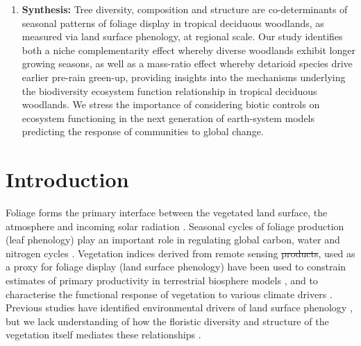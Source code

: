 \documentclass[11pt,a4paper]{article}
\providecommand{\DIFaddtex}[1]{{\protect\color{blue}\uwave{#1}}} %
\providecommand{\DIFdeltex}[1]{{\protect\color{red}\sout{#1}}}                      %
\providecommand{\DIFaddbegin}{} %
\providecommand{\DIFaddend}{} %
\providecommand{\DIFdelbegin}{} %
\providecommand{\DIFdelend}{} %
\providecommand{\DIFadd}[1]{\texorpdfstring{\DIFaddtex{#1}}{#1}} %
\providecommand{\DIFdel}[1]{\texorpdfstring{\DIFdeltex{#1}}{}} %
\newcommand{\DIFscaledelfig}{0.5}
\newlength{\DIFdelgraphicswidth} %
\newlength{\DIFdelgraphicsheight} %
\newcommand{\DIFaddincludegraphics}[2][]{{\color{blue}\fbox{\DIFOincludegraphics[#1]{#2}}}} %
\newcommand{\DIFdelincludegraphics}[2][]{%
\sbox{\DIFdelgraphicsbox}{\DIFOincludegraphics[#1]{#2}}%
\settoboxwidth{\DIFdelgraphicswidth}{\DIFdelgraphicsbox} %
\settoboxtotalheight{\DIFdelgraphicsheight}{\DIFdelgraphicsbox} %
\scalebox{\DIFscaledelfig}{%
\parbox[b]{\DIFdelgraphicswidth}{\usebox{\DIFdelgraphicsbox}\\[-\baselineskip] \rule{\DIFdelgraphicswidth}{0em}}\llap{\resizebox{\DIFdelgraphicswidth}{\DIFdelgraphicsheight}{%
\setlength{\unitlength}{\DIFdelgraphicswidth}%
\begin{picture}(1,1)%
\thicklines\linethickness{2pt} %
{\color[rgb]{1,0,0}\put(0,0){\framebox(1,1){}}}%
{\color[rgb]{1,0,0}\put(0,0){\line( 1,1){1}}}%
{\color[rgb]{1,0,0}\put(0,1){\line(1,-1){1}}}%
\end{picture}%
}\hspace*{3pt}}} %
} %
\DeclareRobustCommand{\DIFaddbegin}{\DIFOaddbegin \let\includegraphics\DIFaddincludegraphics} %
\DeclareRobustCommand{\DIFaddend}{\DIFOaddend \let\includegraphics\DIFOincludegraphics} %
\DeclareRobustCommand{\DIFdelbegin}{\DIFOdelbegin \let\includegraphics\DIFdelincludegraphics} %
\DeclareRobustCommand{\DIFdelend}{\DIFOaddend \let\includegraphics\DIFOincludegraphics} %
\begin{document}
\begin{enumerate}
	\DIFdelbegin %
\DIFdelend \DIFaddbegin \item{\textbf{Synthesis:} Tree diversity, composition and structure are co-determinants
		of seasonal patterns of foliage display in tropical deciduous
		woodlands, as measured via land surface phenology, at regional scale. Our study
		identifies both a niche complementarity effect whereby diverse woodlands
		exhibit longer growing seasons, as well as a mass-ratio effect whereby detarioid
		species drive earlier pre-rain green-up, providing insights into the mechanisms
		underlying the biodiversity ecosystem function relationship in tropical
		deciduous woodlands. We stress the importance of considering biotic
		controls on ecosystem functioning in the next generation of earth-system
		models predicting the response of communities to global change.}
\DIFaddend 

\end{enumerate}

\newpage{}

\section{Introduction}

Foliage forms the primary interface between the vegetated land surface, the
atmosphere and incoming solar radiation \citep{Gu2003, Penuelas2009}. Seasonal
cycles of foliage production (leaf phenology) play an important role in
regulating global carbon, water and nitrogen cycles \citep{Garonna2016}.
Vegetation indices derived from remote sensing \DIFdelbegin \DIFdel{products}\DIFdelend \DIFaddbegin \DIFadd{data}\DIFaddend , used as a proxy for
foliage display (land surface phenology) have been used to constrain estimates
of primary productivity in terrestrial biosphere models \citep{Bloom2016,
Helman2018}, and to characterise the functional response of vegetation to
various climate drivers \citep{Richardson2013}. Previous studies have
identified environmental drivers of land surface phenology \citep{Adole2019,
Guan2014}, but we lack understanding of how the floristic diversity and
structure of the vegetation itself mediates these relationships
\citep{Whitley2017, Pau2011}. 
\end{document}
